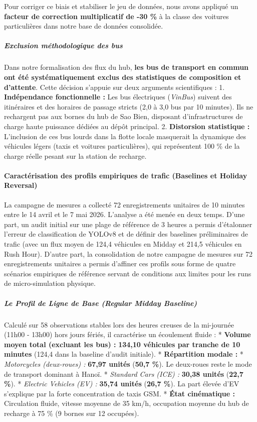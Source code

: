 \documentclass[10pt, a4paper]{article}
\begin{document}
Pour corriger ce biais et stabiliser le jeu de données, nous avons
appliqué un \textbf{facteur de correction multiplicatif de -30 \%} à la
classe des voitures particulières dans notre base de données consolidée.

\subparagraph{Exclusion méthodologique des
bus}\label{exclusion-muxe9thodologique-des-bus}

Dans notre formalisation des flux du hub, \textbf{les bus de transport
en commun ont été systématiquement exclus des statistiques de
composition et d'attente}. Cette décision s'appuie sur deux arguments
scientifiques : 1. \textbf{Indépendance fonctionnelle :} Les bus
électriques (\emph{VinBus}) suivent des itinéraires et des horaires de
passage stricts (2,0 à 3,0 bus par 10 minutes). Ils ne rechargent pas
aux bornes du hub de Sao Bien, disposant d'infrastructures de charge
haute puissance dédiées au dépôt principal. 2. \textbf{Distorsion
statistique :} L'inclusion de ces bus lourds dans la flotte locale
masquerait la dynamique des véhicules légers (taxis et voitures
particulières), qui représentent 100 \% de la charge réelle pesant sur
la station de recharge.

\paragraph{Caractérisation des profils empiriques de trafic (Baselines
et Holiday
Reversal)}\label{caractuxe9risation-des-profils-empiriques-de-trafic-baselines-et-holiday-reversal}

La campagne de mesures a collecté 72 enregistrements unitaires de 10
minutes entre le 14 avril et le 7 mai 2026. L'analyse a été menée en
deux temps. D'une part, un audit initial sur une plage de référence de 3
heures a permis d'étalonner l'erreur de classification de YOLOv8 et de
définir des baselines préliminaires de trafic (avec un flux moyen de
124,4 véhicules en Midday et 214,5 véhicules en Rush Hour). D'autre
part, la consolidation de notre campagne de mesures sur 72
enregistrements unitaires a permis d'affiner ces profils sous forme de
quatre scénarios empiriques de référence servant de conditions aux
limites pour les runs de micro-simulation physique.

\subparagraph{Le Profil de Ligne de Base (Regular Midday
Baseline)}\label{le-profil-de-ligne-de-base-regular-midday-baseline}

Calculé sur 58 observations stables lors des heures creuses de la
mi-journée (11h00 - 13h00) hors jours fériés, il caractérise un
écoulement fluide : * \textbf{Volume moyen total (excluant les bus) :}
\textbf{134,10 véhicules par tranche de 10 minutes} (124,4 dans la
baseline d'audit initiale). * \textbf{Répartition modale :} *
\emph{Motorcycles (deux-roues) :} \textbf{67,97 unités} (\textbf{50,7
\%}). Le deux-roues reste le mode de transport dominant à Hanoï. *
\emph{Standard Cars (ICE) :} \textbf{30,38 unités} (\textbf{22,7 \%}). *
\emph{Electric Vehicles (EV) :} \textbf{35,74 unités} (\textbf{26,7
\%}). La part élevée d'EV s'explique par la forte concentration de taxis
GSM. * \textbf{État cinématique :} Circulation fluide, vitesse moyenne
de 35 km/h, occupation moyenne du hub de recharge à 75 \% (9 bornes sur
12 occupées).
\end{document}
